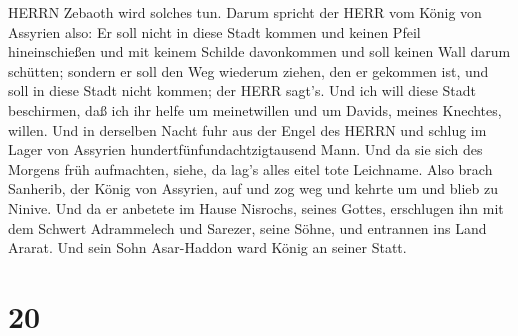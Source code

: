 HERRN Zebaoth wird solches tun.  Darum spricht der HERR vom
König von Assyrien also: Er soll nicht in diese Stadt kommen und keinen
Pfeil hineinschießen und mit keinem Schilde davonkommen und soll keinen
Wall darum schütten;  sondern er soll den Weg wiederum
ziehen, den er gekommen ist, und soll in diese Stadt nicht kommen; der
HERR sagt's.  Und ich will diese Stadt beschirmen, daß ich
ihr helfe um meinetwillen und um Davids, meines Knechtes, willen.
 Und in derselben Nacht fuhr aus der Engel des HERRN und
schlug im Lager von Assyrien hundertfünfundachtzigtausend Mann. Und da
sie sich des Morgens früh aufmachten, siehe, da lag's alles eitel tote
Leichname.  Also brach Sanherib, der König von Assyrien,
auf und zog weg und kehrte um und blieb zu Ninive.  Und da
er anbetete im Hause Nisrochs, seines Gottes, erschlugen ihn mit dem
Schwert Adrammelech und Sarezer, seine Söhne, und entrannen ins Land
Ararat. Und sein Sohn Asar-Haddon ward König an seiner Statt.

\hypertarget{section-19}{%
\section{20}\label{section-19}}

